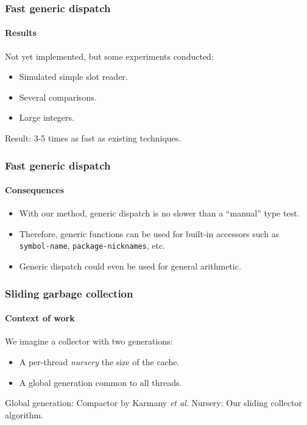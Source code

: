 \documentclass[12pt]{beamer}
\begin{document}
\begin{frame}
  \frametitle{Fast generic dispatch}
  \framesubtitle{Results}

  Not yet implemented, but some experiments conducted:

  \begin{itemize}
  \item Simulated simple slot reader.
  \item Several comparisons.
  \item Large integers.
  \end{itemize}

Result: 3-5 times as fast as existing techniques.

\end{frame}
\begin{frame}
  \frametitle{Fast generic dispatch}
  \framesubtitle{Consequences}

  \begin{itemize}
  \item With our method, generic dispatch is no slower than
    a ``manual'' type test.
  \item Therefore, generic functions can be used for built-in
    accessors such as \texttt{symbol-name},
    \texttt{package-nicknames}, etc.
  \item Generic dispatch could even be used for general arithmetic.
  \end{itemize}

\end{frame}
\begin{frame}
  \frametitle{Sliding garbage collection}
  \framesubtitle{Context of work}

  We imagine a collector with two generations:

  \begin{itemize}
  \item A per-thread \emph{nursery} the size of the cache.
  \item A global generation common to all threads.
  \end{itemize}

Global generation: Compactor by Karmany \emph{et al}.
\vskip 0.25cm
Nursery: Our sliding collector algorithm.

\end{frame}
\end{document}
